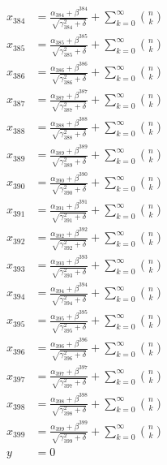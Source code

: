 \documentclass{article}
\begin{document}
\begin{align}
  x_{384} &= \frac{\alpha_{384} + \beta^{384}}{\sqrt{\gamma_{384}^2 + \delta}} + \sum_{k=0}^{\infty} \binom{n}{k} \label{eq:384} \\
  x_{385} &= \frac{\alpha_{385} + \beta^{385}}{\sqrt{\gamma_{385}^2 + \delta}} + \sum_{k=0}^{\infty} \binom{n}{k} \label{eq:385} \\
  x_{386} &= \frac{\alpha_{386} + \beta^{386}}{\sqrt{\gamma_{386}^2 + \delta}} + \sum_{k=0}^{\infty} \binom{n}{k} \label{eq:386} \\
  x_{387} &= \frac{\alpha_{387} + \beta^{387}}{\sqrt{\gamma_{387}^2 + \delta}} + \sum_{k=0}^{\infty} \binom{n}{k} \label{eq:387} \\
  x_{388} &= \frac{\alpha_{388} + \beta^{388}}{\sqrt{\gamma_{388}^2 + \delta}} + \sum_{k=0}^{\infty} \binom{n}{k} \label{eq:388} \\
  x_{389} &= \frac{\alpha_{389} + \beta^{389}}{\sqrt{\gamma_{389}^2 + \delta}} + \sum_{k=0}^{\infty} \binom{n}{k} \label{eq:389} \\
  x_{390} &= \frac{\alpha_{390} + \beta^{390}}{\sqrt{\gamma_{390}^2 + \delta}} + \sum_{k=0}^{\infty} \binom{n}{k} \label{eq:390} \\
  x_{391} &= \frac{\alpha_{391} + \beta^{391}}{\sqrt{\gamma_{391}^2 + \delta}} + \sum_{k=0}^{\infty} \binom{n}{k} \label{eq:391} \\
  x_{392} &= \frac{\alpha_{392} + \beta^{392}}{\sqrt{\gamma_{392}^2 + \delta}} + \sum_{k=0}^{\infty} \binom{n}{k} \label{eq:392} \\
  x_{393} &= \frac{\alpha_{393} + \beta^{393}}{\sqrt{\gamma_{393}^2 + \delta}} + \sum_{k=0}^{\infty} \binom{n}{k} \label{eq:393} \\
  x_{394} &= \frac{\alpha_{394} + \beta^{394}}{\sqrt{\gamma_{394}^2 + \delta}} + \sum_{k=0}^{\infty} \binom{n}{k} \label{eq:394} \\
  x_{395} &= \frac{\alpha_{395} + \beta^{395}}{\sqrt{\gamma_{395}^2 + \delta}} + \sum_{k=0}^{\infty} \binom{n}{k} \label{eq:395} \\
  x_{396} &= \frac{\alpha_{396} + \beta^{396}}{\sqrt{\gamma_{396}^2 + \delta}} + \sum_{k=0}^{\infty} \binom{n}{k} \label{eq:396} \\
  x_{397} &= \frac{\alpha_{397} + \beta^{397}}{\sqrt{\gamma_{397}^2 + \delta}} + \sum_{k=0}^{\infty} \binom{n}{k} \label{eq:397} \\
  x_{398} &= \frac{\alpha_{398} + \beta^{398}}{\sqrt{\gamma_{398}^2 + \delta}} + \sum_{k=0}^{\infty} \binom{n}{k} \label{eq:398} \\
  x_{399} &= \frac{\alpha_{399} + \beta^{399}}{\sqrt{\gamma_{399}^2 + \delta}} + \sum_{k=0}^{\infty} \binom{n}{k} \label{eq:399} \\
  y &= 0
\end{align}
\end{document}
